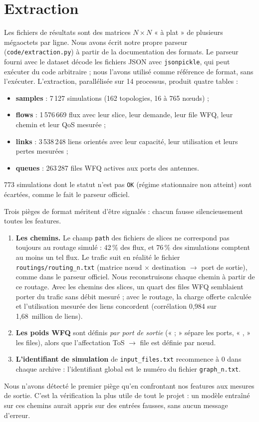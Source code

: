 \documentclass[11pt,a4paper]{report}
\begin{document}
\section{Extraction}
Les fichiers de résultats sont des matrices $N\times N$ « à plat » de plusieurs mégaoctets par ligne. Nous avons écrit notre propre parseur (\texttt{code/extraction.py}) à partir de la documentation des formats. Le parseur fourni avec le dataset décode les fichiers JSON avec \texttt{jsonpickle}, qui peut exécuter du code arbitraire ; nous l'avons utilisé comme référence de format, sans l'exécuter. L'extraction, parallélisée sur 14 processus, produit quatre tables :
\begin{itemize}[nosep]
  \item \textbf{samples} : 7\,127 simulations (162 topologies, 16 à 765 nœuds) ;
  \item \textbf{flows} : 1\,576\,669 flux avec leur slice, leur demande, leur file WFQ, leur chemin et leur QoS mesurée ;
  \item \textbf{links} : 3\,538\,248 liens orientés avec leur capacité, leur utilisation et leurs pertes mesurées ;
  \item \textbf{queues} : 263\,287 files WFQ actives aux ports des antennes.
\end{itemize}
773 simulations dont le statut n'est pas \texttt{OK} (régime stationnaire non atteint) sont écartées, comme le fait le parseur officiel.

Trois pièges de format méritent d'être signalés : chacun fausse silencieusement toutes les features.
\begin{enumerate}[nosep]
  \item \textbf{Les chemins.} Le champ \texttt{path} des fichiers de slices ne correspond pas toujours au routage simulé : 42\,\% des flux, et 76\,\% des simulations comptent au moins un tel flux. Le trafic suit en réalité le fichier \texttt{routings/routing\_n.txt} (matrice nœud $\times$ destination $\to$ port de sortie), comme dans le parseur officiel. Nous reconstruisons chaque chemin à partir de ce routage. Avec les chemins des slices, un quart des files WFQ semblaient porter du trafic sans débit mesuré ; avec le routage, la charge offerte calculée et l'utilisation mesurée des liens concordent (corrélation 0,984 sur 1,68~million de liens).
  \item \textbf{Les poids WFQ} sont définis \emph{par port de sortie} (« ; » sépare les ports, « , » les files), alors que l'affectation ToS $\to$ file est définie par nœud.
  \item \textbf{L'identifiant de simulation} de \texttt{input\_files.txt} recommence à 0 dans chaque archive : l'identifiant global est le numéro du fichier \texttt{graph\_n.txt}.
\end{enumerate}
Nous n'avons détecté le premier piège qu'en confrontant nos features aux mesures de sortie. C'est la vérification la plus utile de tout le projet : un modèle entraîné sur ces chemins aurait appris sur des entrées fausses, sans aucun message d'erreur.
\end{document}

